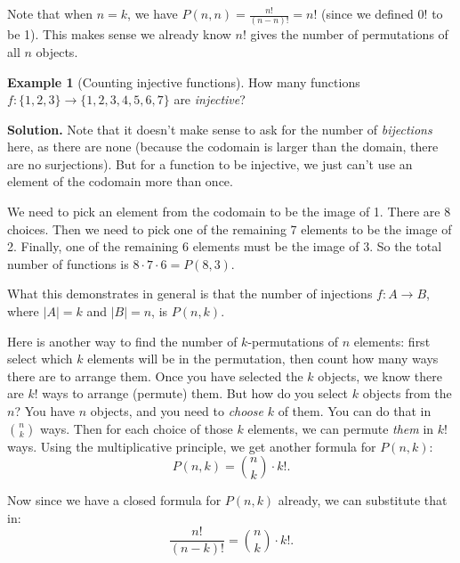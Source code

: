 \documentclass[10pt,]{book}
\theoremstyle{plain}
\theoremstyle{definition}
\newtheorem{example}[theorem]{Example}
\theoremstyle{definition}
\theoremstyle{definition}
\numberwithin{equation}{section}
\newcommand{\card}[1]{\left| #1 \right|}
\begin{document}
        Note that when \(n = k\), we have \(P(n,n) = \frac{n!}{(n-n)!} = n!\) (since we defined \(0!\) to be 1). This makes sense
        \textemdash{}we already know \(n!\) gives the number of permutations of all \(n\) objects.
\begin{example}[Counting injective functions]\label{ex_counting-functions-injective}
How many functions \(f:\{1,2,3\} \to \{1,2,3,4,5,6,7\}\) are \emph{injective}?%
\par\medskip\noindent%
\textbf{Solution.}\quad 
            Note that it doesn't make sense to ask for the number of \emph{bijections} here, as there are none (because the codomain is larger than the domain, there are no surjections). But for a function to be injective, we just can't use an element of the codomain more than once.
\par

            We need to pick an element from the codomain to be the image of 1. There are 8 choices. Then we need to pick one of the remaining 7 elements to be the image of 2. Finally, one of the remaining 6 elements must be the image of 3. So the total number of functions is \(8\cdot 7 \cdot 6 = P(8,3)\).
\par

            What this demonstrates in general is that the number of injections \(f:A \to B\), where \(\card{A} = k\) and \(\card{B} = n\), is \(P(n,k)\).
\end{example}
\par

          Here is another way to find the number of \(k\)-permutations of \(n\) elements: first select which \(k\) elements will be in the permutation, then count how many ways there are to arrange them. Once you have selected the \(k\) objects, we know there are \(k!\) ways to arrange (permute) them. But how do you select \(k\) objects from the \(n\)? You have \(n\) objects, and you need to \emph{choose} \(k\) of them. You can do that in \({n \choose k}\) ways. Then for each choice of those \(k\) elements, we can permute \emph{them} in \(k!\) ways. Using the multiplicative principle, we get another formula for \(P(n,k)\):
          \begin{equation*}
            P(n,k) = {n \choose k}\cdot k!.
          \end{equation*}
\par

          Now since we have a closed formula for \(P(n,k)\) already, we can substitute that in:
          \begin{equation*}
            \frac{n!}{(n-k)!} = {n \choose k} \cdot k!.
          \end{equation*}
\par
\end{document}
